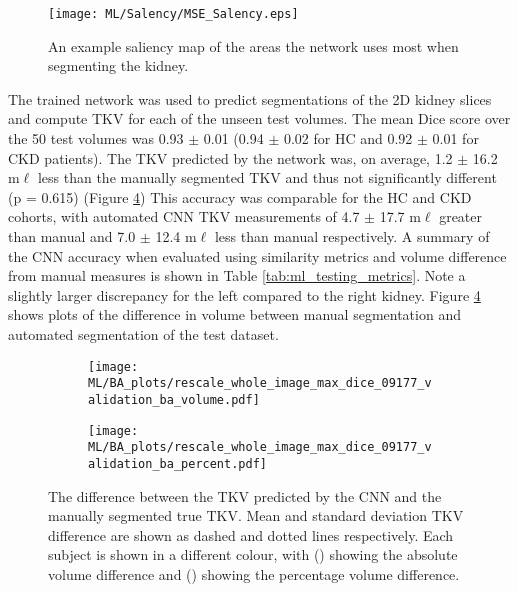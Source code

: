 \begin{figure}[H]
	\centering
	\texttt{[image: ML/Salency/MSE\_Salency.eps]}
	\caption{An example saliency map of the areas the network uses most when segmenting the kidney.}
	\label{fig:ml_salency}	
\end{figure}

The trained network was used to predict segmentations of the 2D kidney slices and compute \ac{TKV} for each of the unseen test volumes. The mean Dice score over the 50 test volumes was 0.93 $\pm$ 0.01 (0.94 $\pm$ 0.02 for HC and 0.92 $\pm$ 0.01 for \ac{CKD} patients). The \ac{TKV} predicted by the network was, on average, 1.2 $\pm$ 16.2 m$\ell$ less than the manually segmented \ac{TKV} and thus not significantly different (p = 0.615) (Figure \ref{fig:ml_testing_ba}) This accuracy was comparable for the \ac{HC} and \ac{CKD} cohorts, with automated CNN \ac{TKV} measurements of 4.7 $\pm$ 17.7 m$\ell$ greater than manual and 7.0 $\pm$ 12.4 m$\ell$ less than manual respectively. A summary of the \ac{CNN} accuracy when evaluated using similarity metrics and volume difference from manual measures is shown in Table \ref{tab:ml_testing_metrics}. Note a slightly larger discrepancy for the left compared to the right kidney. Figure \ref{fig:ml_testing_ba} shows plots of the difference in volume between manual segmentation and automated segmentation of the test dataset. 

\begin{figure}[H]
	\centering
	\begin{subfigure}[c]{0.47\textwidth}
		\centering
		\texttt{[image: ML/BA\_plots/rescale\_whole\_image\_max\_dice\_09177\_validation\_ba\_volume.pdf]}
		\caption{}
		\label{fig:ml_testing_ba_volume}
	\end{subfigure}
	\hfill
	\begin{subfigure}[c]{0.47\textwidth}
		\centering
		\texttt{[image: ML/BA\_plots/rescale\_whole\_image\_max\_dice\_09177\_validation\_ba\_percent.pdf]}
		\caption{}
		\label{fig:ml_testing_ba_percent}
	\end{subfigure}
	\caption{The difference between the \ac{TKV} predicted by the \ac{CNN} and the manually segmented true \ac{TKV}. Mean and standard deviation \ac{TKV} difference are shown as dashed and dotted lines respectively. Each subject is shown in a different colour, with () showing the absolute volume difference and () showing the percentage volume difference.}
	\label{fig:ml_testing_ba}
\end{figure}

